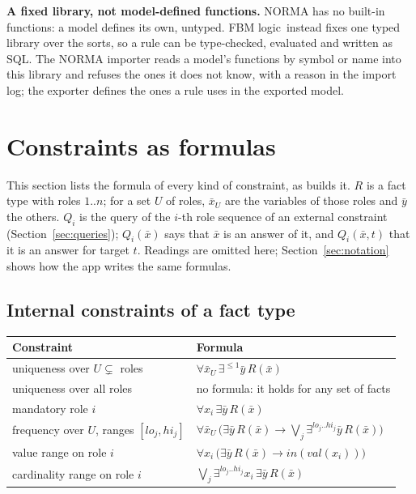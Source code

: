 \documentclass[11pt, a4paper]{article}
\newcommand{\FBM}{FBM logic}
\newcommand{\val}{\mathit{val}}
\begin{document}
\begin{rationale}
\textbf{A fixed library, not model-defined functions.} NORMA has no built-in
functions: a model defines its own, untyped. \FBM\ instead fixes one typed
library over the sorts, so a rule can be type-checked, evaluated and written
as SQL. The NORMA importer reads a model's functions by symbol or name into
this library and refuses the ones it does not know, with a reason in the
import log; the exporter defines the ones a rule uses in the exported model.
\end{rationale}

\section{Constraints as formulas}
\label{sec:constraints}

This section lists the formula of every kind of constraint, as
 builds it. $R$ is a fact type with roles $1..n$; for a set
$U$ of roles, $\bar x_U$ are the variables of those roles and $\bar y$ the
others. $Q_i$ is the query of the $i$-th role sequence of an external
constraint (Section~\ref{sec:queries}); $Q_i(\bar x)$ says that $\bar x$ is
an answer of it, and $Q_i(\bar x, t)$ that it is an answer for target $t$.
Readings are omitted here; Section~\ref{sec:notation} shows how the app
writes the same formulas.

\subsection{Internal constraints of a fact type}

\begin{center}
\small
\begin{tabularx}{\textwidth}{l X}
\toprule
\textbf{Constraint} & \textbf{Formula} \\
\midrule
uniqueness over $U \subsetneq$ roles & $\forall \bar x_U\, \exists^{\le 1} \bar y\, R(\bar x)$ \\
uniqueness over all roles & no formula: it holds for any set of facts \\
mandatory role $i$ & $\forall x_i\, \exists \bar y\, R(\bar x)$ \\
frequency over $U$, ranges $[\mathit{lo}_j,\mathit{hi}_j]$ & $\forall \bar x_U\, \bigl(\exists\bar y\, R(\bar x) \to \bigvee_j \exists^{\mathit{lo}_j..\mathit{hi}_j}\bar y\, R(\bar x)\bigr)$ \\
value range on role $i$ & $\forall x_i\,\bigl(\exists\bar y\, R(\bar x) \to \mathit{in}(\val(x_i))\bigr)$ \\
cardinality range on role $i$ & $\bigvee_j \exists^{\mathit{lo}_j..\mathit{hi}_j} x_i\, \exists \bar y\, R(\bar x)$ \\
\bottomrule
\end{tabularx}
\end{center}
\end{document}
